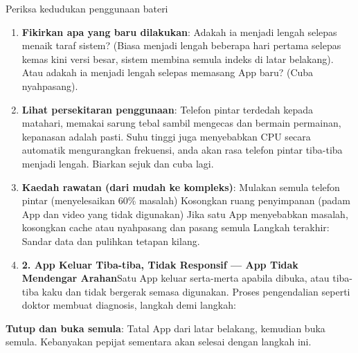 


Periksa kedudukan penggunaan bateri


\begin{enumerate}
  \item \textbf{Fikirkan apa yang baru dilakukan}: Adakah ia menjadi lengah selepas menaik taraf sistem? (Biasa menjadi lengah beberapa hari pertama selepas kemas kini versi besar, sistem membina semula indeks di latar belakang). Atau adakah ia menjadi lengah selepas memasang App baru? (Cuba nyahpasang).
  \item \textbf{Lihat persekitaran penggunaan}: Telefon pintar terdedah kepada matahari, memakai sarung tebal sambil mengecas dan bermain permainan, kepanasan adalah pasti. Suhu tinggi juga menyebabkan CPU secara automatik mengurangkan frekuensi, anda akan rasa telefon pintar tiba-tiba menjadi lengah. Biarkan sejuk dan cuba lagi.
  \item \textbf{Kaedah rawatan (dari mudah ke kompleks)}: Mulakan semula telefon pintar (menyelesaikan 60\% masalah) Kosongkan ruang penyimpanan (padam App dan video yang tidak digunakan) Jika satu App menyebabkan masalah, kosongkan cache atau nyahpasang dan pasang semula Langkah terakhir: Sandar data dan pulihkan tetapan kilang.
  \item \textbf{2. App Keluar Tiba-tiba, Tidak Responsif — App Tidak Mendengar Arahan}Satu App keluar serta-merta apabila dibuka, atau tiba-tiba kaku dan tidak bergerak semasa digunakan. Proses pengendalian seperti doktor membuat diagnosis, langkah demi langkah:
\end{enumerate}

\textbf{Tutup dan buka semula}: Tatal App dari latar belakang, kemudian buka semula. Kebanyakan pepijat sementara akan selesai dengan langkah ini.

